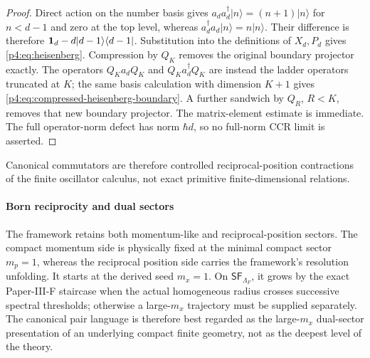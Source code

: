 \documentclass[12pt,a4paper]{article}
\begin{document}
\begin{proof}
Direct action on the number basis gives
\(a_da_d^\dagger|n\rangle=(n+1)|n\rangle\) for \(n<d-1\) and zero at the top level,
whereas \(a_d^\dagger a_d|n\rangle=n|n\rangle\).  Their difference is therefore
\(\mathbf{1}_d-d|d-1\rangle\langle d-1|\).  Substitution into the definitions of
\(X_d,P_d\) gives \eqref{p4:eq:heisenberg}.  Compression by \(Q_K\) removes the
original boundary projector exactly.  The operators \(Q_Ka_dQ_K\) and
\(Q_Ka_d^\dagger Q_K\) are instead the ladder operators truncated at \(K\);
the same basis calculation with dimension \(K+1\) gives
\eqref{p4:eq:compressed-heisenberg-boundary}.  A further sandwich by \(Q_R\),
\(R<K\), removes that new boundary projector.  The matrix-element estimate is
immediate.  The full
operator-norm defect has norm \(\hbar d\), so no full-norm CCR limit is asserted.
\end{proof}

Canonical commutators are therefore controlled reciprocal-position contractions of
the finite oscillator calculus, not exact primitive finite-dimensional relations.



\paragraph{Born reciprocity and dual sectors}
\label{p4:sec:part2-reciprocity}

The framework retains both momentum-like and reciprocal-position sectors.
The compact momentum side is physically fixed at the minimal compact sector
\(m_p=1\), whereas the reciprocal position side carries the framework's
resolution unfolding.  It starts at the derived seed \(m_x=1\).  On
\(\mathsf{SF}_{\Lambda_F}\), it grows by the exact Paper-III-F staircase when the
actual homogeneous radius crosses successive spectral thresholds; otherwise
a large-\(m_x\) trajectory must be supplied separately.
The canonical pair language is therefore best regarded as the large-\(m_x\) dual-sector presentation of an underlying compact finite geometry, not as the deepest level of the theory.
\end{document}
